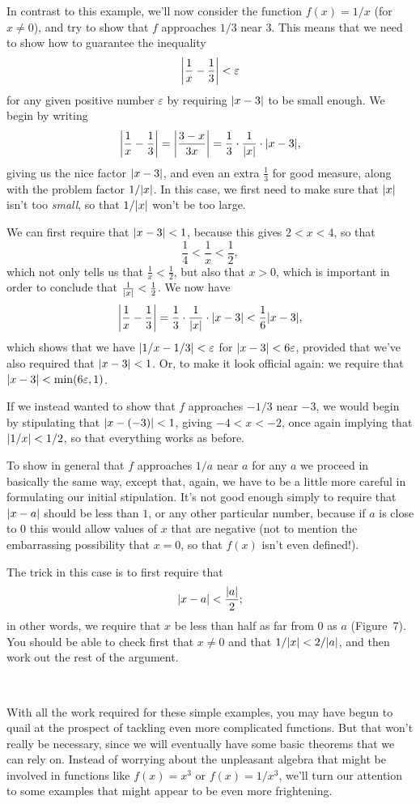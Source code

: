 In contrast to this example, we'll now consider the function $f(x)=1/x$ (for
$x\neq 0$), and try to show that $f$ approaches $1/3$ near $3$. This means that
we need to show how to guarantee the inequality
\[
\abs*{\frac{1}{x}-\frac{1}{3}}<\varepsilon
\]
for any given positive number $\varepsilon$ by requiring $\abs{x-3}$ to be
small enough. We begin by writing
\[
\abs*{\frac{1}{x}-\frac{1}{3}}=\abs*{\frac{3-x}{3x}}=\frac{1}{3}\cdot\frac{1}{\abs{x}}\cdot\abs{x-3},
\]
giving us the nice factor $\abs{x-3}$, and even an extra $\frac{1}{3}$ for
good measure, along with the problem factor $1/\abs{x}$. In this case, we first
need to make sure that $\abs{x}$ isn't too \emph{small}, so that $1/\abs{x}$
won't be too large.

We can first require that $\abs{x-3}<1$, because this gives $2<x<4$, so that
\[
\frac{1}{4}<\frac{1}{x}<\frac{1}{2},
\]
which not only tells us that $\frac{1}{x}<\frac{1}{2}$, but also that $x>0$,
which is important in order to conclude that $\frac{1}{\abs{x}}<\frac{1}{2}$.
We now have
\[
\abs*{\frac{1}{x}-\frac{1}{3}}=\frac{1}{3}\cdot\frac{1}{\abs{x}}\cdot\abs{x-3}<\frac{1}{6}\abs{x-3},
\]
which shows that we have $\abs{1/x-1/3}<\varepsilon$ for
$\abs{x-3}<6\varepsilon$, provided that we've also required that
$\abs{x-3}<1$. Or, to make it look official again: we require that
$\abs{x-3}<\min(6\varepsilon,1)$.

If we instead wanted to show that $f$ approaches $-1/3$ near $-3$, we would
begin by stipulating that $\abs{x-(-3)}<1$, giving $-4<x<-2$, once again
implying that $\abs{1/x}<1/2$, so that everything works as before.

To show in general that $f$ approaches $1/a$ near $a$ for any $a$ we proceed
in basically the same way, except that, again, we have to be a little more
careful in formulating our initial stipulation. It's not good enough simply to
require that $\abs{x-a}$ should be less than $1$, or any other particular
number, because if $a$ is close to $0$ this would allow values of $x$ that are
negative (not to mention the embarrassing possibility that $x=0$, so that
$f(x)$ isn't even defined!).

The trick in this case is to first require that
\[
\abs{x-a}<\frac{\abs{a}}{2};
\]
in other words, we require that $x$ be less than half as far from $0$ as $a$
(Figure~7). You should be able to check first that $x\neq 0$ and that
$1/\abs{x}<2/\abs{a}$, and then work out the rest of the argument.

\begin{center}
\\[0.6em]
\end{center}
With all the work required for these simple examples, you may have begun to
quail at the prospect of tackling even more complicated functions. But that
won't really be necessary, since we will eventually have some basic theorems
that we can rely on. Instead of worrying about the unpleasant algebra that
might be involved in functions like $f(x)=x^3$ or $f(x)=1/x^3$, we'll turn our
attention to some examples that might appear to be even more frightening.

